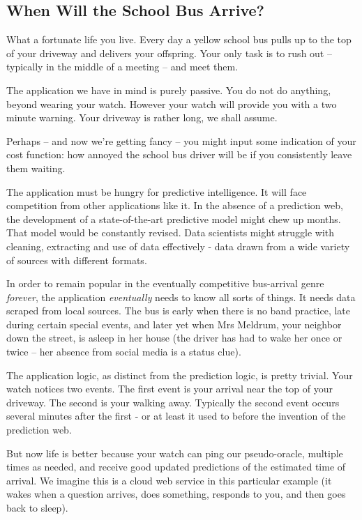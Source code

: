 \subsection{When Will the School Bus Arrive?}

What a fortunate life you live. Every day a yellow school bus pulls up to the top of your driveway and delivers your offspring. Your only task is to rush out -- typically in the middle of a meeting -- and meet them. 

The application we have in mind is purely passive. You do not do anything, beyond wearing your watch. However your watch will provide you with a two minute warning. Your driveway is rather long, we shall assume. 

Perhaps -- and now we're getting fancy -- you might input some indication of your cost function: how annoyed the school bus driver will be if you consistently leave them waiting. 

The application must be hungry for predictive intelligence. It will face competition from other applications like it. In the absence of a prediction web, the development of a state-of-the-art predictive model might chew up months. That model would be constantly revised. Data scientists might struggle with cleaning, extracting and use of data effectively - data drawn from a wide variety of sources with different formats.  

In order to remain popular in the eventually competitive bus-arrival genre {\em forever}, the application {\em eventually} needs to know all sorts of things. It needs data scraped from local sources. The bus is early when there is no band practice, late during certain special events, and later yet when Mrs Meldrum, your neighbor down the street, is asleep in her house (the driver has had to wake her once or twice -- her absence from social media is a status clue).   

The application logic, as distinct from the prediction logic, is pretty trivial. Your watch notices two events. The first event is your arrival near the top of your driveway. The second is your walking away. Typically the second event occurs several minutes after the first - or at least it used to before the invention of the prediction web. 

But now life is better because your watch can ping our pseudo-oracle, multiple times as needed, and receive good updated predictions of the estimated time of arrival. We imagine this is a cloud web service in this particular example (it wakes when a question arrives, does something, responds to you, and then goes back to sleep). 

